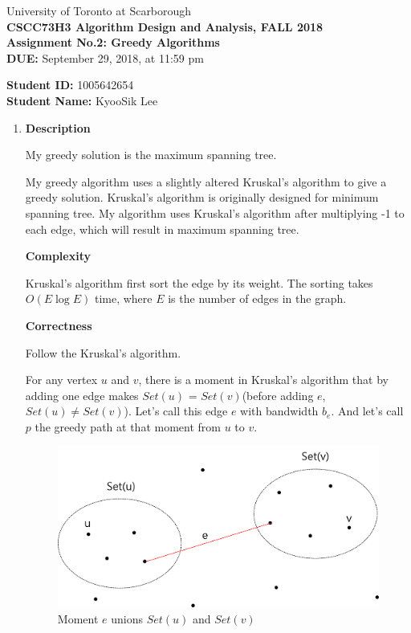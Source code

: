 \documentclass[a4paper,11pt]{article}
\begin{document}
\begin{center}
University of Toronto at Scarborough\\[0.1in]
{\bf CSCC73H3 Algorithm Design and Analysis, FALL 2018} \\[0.1in]
{\large{\bf Assignment No.2: Greedy Algorithms}}\\[0.1in]
{\bf DUE:} September 29, 2018, at 11:59 pm
\end{center}


\vspace{0.1in}
\noindent
{\bf Student ID:} 1005642654 \\[0.15in]
{\bf Student Name:} KyooSik Lee
\vspace{0.3in}

\vspace{0.3in}
\begin{enumerate}

\item {\bf Description}

My greedy solution is the maximum spanning tree.

My greedy algorithm uses a slightly altered Kruskal's algorithm to give a greedy solution.
Kruskal's algorithm is originally designed for minimum spanning tree. 
My algorithm uses Kruskal's algorithm after multiplying -1 to each edge, which will result in maximum spanning tree.


{\bf Complexity}

Kruskal's algorithm first sort the edge by its weight.
The sorting takes $O(E\log{}E)$ time, where $E$ is the number of edges in the graph.



{\bf Correctness}

Follow the Kruskal's algorithm.

For any vertex $u$ and $v$, there is a moment in Kruskal's algorithm that by adding one edge makes $Set(u)$ = $Set(v)$(before adding $e$, $Set(u)\neq Set(v)$).
Let's call this edge $e$ with bandwidth $b_e$.
And let's call $p$ the greedy path at that moment from $u$ to $v$.
\begin{figure}[hbt]
	\centering
	\includegraphics[scale=0.4]{figure1.png}
	\caption{Moment $e$ unions $Set(u)$ and $Set(v)$}
\end{figure}


\end{enumerate}
\end{document}
